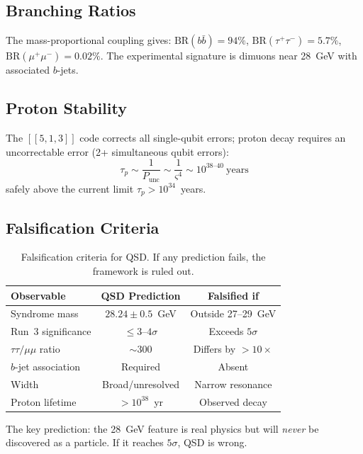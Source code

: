 \documentclass[11pt,a4paper]{article}
\theoremstyle{definition}
\newcommand{\strain}{\varsigma}
\newcommand{\Punc}{P_{\text{unc}}}
\begin{document}
\subsection{Branching Ratios}

The mass-proportional coupling gives: $\text{BR}(b\bar{b}) = 94\%$, $\text{BR}(\tau^+\tau^-) = 5.7\%$, $\text{BR}(\mu^+\mu^-) = 0.02\%$. The experimental signature is dimuons near 28~GeV with associated $b$-jets.

\subsection{Proton Stability}

The $[[5,1,3]]$ code corrects all single-qubit errors; proton decay requires an uncorrectable error (2+ simultaneous qubit errors):
\begin{equation}
\tau_p \sim \frac{1}{\Punc} \sim \frac{1}{\strain^4} \sim 10^{38\text{--}40}~\text{years}
\label{eq:proton}
\end{equation}
safely above the current limit $\tau_p > 10^{34}$~years.

\subsection{Falsification Criteria}

\begin{table}[h]
\centering
\begin{tabular}{lcc}
\toprule
\textbf{Observable} & \textbf{QSD Prediction} & \textbf{Falsified if} \\
\midrule
Syndrome mass & $28.24 \pm 0.5$~GeV & Outside 27--29~GeV \\
Run~3 significance & $\leq 3$--$4\sigma$ & Exceeds $5\sigma$ \\
$\tau\tau/\mu\mu$ ratio & $\sim 300$ & Differs by $> 10\times$ \\
$b$-jet association & Required & Absent \\
Width & Broad/unresolved & Narrow resonance \\
Proton lifetime & $> 10^{38}$~yr & Observed decay \\
\bottomrule
\end{tabular}
\caption{Falsification criteria for QSD. If any prediction fails, the framework is ruled out.}
\label{tab:falsification}
\end{table}

The key prediction: the 28~GeV feature is real physics but will \emph{never} be discovered as a particle. If it reaches $5\sigma$, QSD is wrong.
\end{document}
